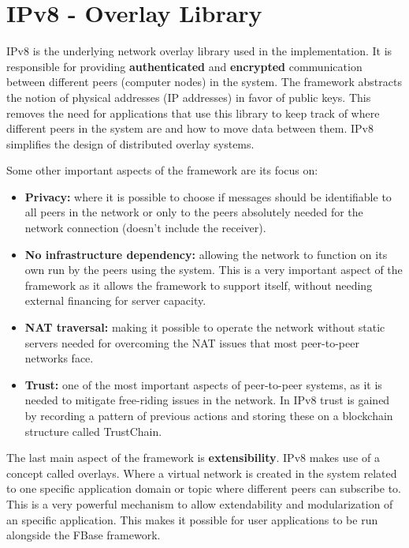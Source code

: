 \section{IPv8 - Overlay Library}

IPv8 is the underlying network overlay library used in the implementation. It is responsible for providing \textbf{authenticated} and \textbf{encrypted} communication between different peers (computer nodes) in the system. The framework abstracts the notion of physical addresses (IP addresses) in favor of public keys. This removes the need for applications that use this library to keep track of where different peers in the system are and how to move data between them. IPv8 simplifies the design of distributed overlay systems. 

Some other important aspects of the framework are its focus on:
\begin{itemize}
	\item \textbf{Privacy:} where it is possible to choose if messages should be identifiable to all peers in the network or only to the peers absolutely needed for the network connection (doesn't include the receiver). 
	\item \textbf{No infrastructure dependency:} allowing the network to function on its own run by the peers using the system. This is a very important aspect of the framework as it allows the framework to support itself, without needing external financing for server capacity.
	\item \textbf{NAT traversal:} making it possible to operate the network without static servers needed for overcoming the NAT issues that most peer-to-peer networks face.
	\item \textbf{Trust:} one of the most important aspects of peer-to-peer systems, as it is needed to mitigate free-riding issues in the network. In IPv8 trust is gained by recording a pattern of previous actions and storing these on a blockchain structure called TrustChain.
\end{itemize}

The last main aspect of the framework is \textbf{extensibility}. IPv8 makes use of a concept called overlays. Where a virtual network is created in the system related to one specific application domain or topic where different peers can subscribe to. This is a very powerful mechanism to allow extendability and modularization of an specific application. This makes it possible for user applications to be run alongside the FBase framework.

